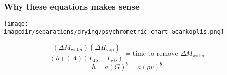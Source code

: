 \begin{frame}\frametitle{Why these equations makes sense}

	\begin{center}
		\texttt{[image: \\imagedir/separations/drying/psychrometric-chart-Geankoplis.png]}
	\end{center}
	\vspace{-6pt}
	\[\frac{(\Delta M_\text{water}) (\Delta H_\text{vap})}{(h)(A)(T_\text{db} - T_\text{wb})} = \text{time to remove $\Delta M_\text{water}$}
	\]
	\[h = a(G)^{b} = a(\rho v)^{b}\]
	
\end{frame}


